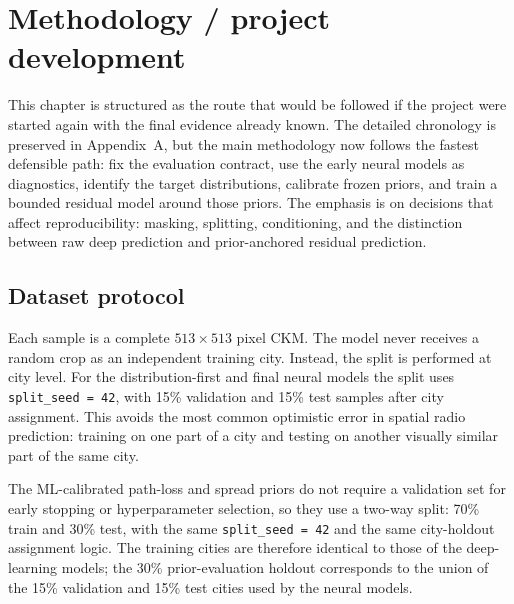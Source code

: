 \chapter{Methodology / project development}

This chapter is structured as the route that would be followed if the project
were started again with the final evidence already known. The detailed
chronology is preserved in Appendix~A, but the main methodology now follows the
fastest defensible path: fix the evaluation contract, use the early neural
models as diagnostics, identify the target distributions, calibrate frozen
priors, and train a bounded residual model around those priors. The emphasis is
on decisions that affect reproducibility: masking, splitting, conditioning, and
the distinction between raw deep prediction and prior-anchored residual
prediction.

\section{Dataset protocol}

Each sample is a complete $513\times513$ pixel CKM. The model never receives a
random crop as an independent training city. Instead, the split is performed at
city level. For the distribution-first and final neural models the split uses
\texttt{split\_seed = 42}, with 15\% validation and 15\% test samples after
city assignment. This avoids the most common optimistic error in spatial radio
prediction: training on one part of a city and testing on another visually
similar part of the same city.

The ML-calibrated path-loss and spread priors do not require a validation set for early stopping or hyperparameter
selection, so they use a two-way split: 70\% train and 30\% test, with the
same \texttt{split\_seed = 42} and the same city-holdout assignment logic.
The training cities are therefore identical to those of the deep-learning
models; the 30\% prior-evaluation holdout corresponds to the union of the
15\% validation and 15\% test cities used by the neural models.

